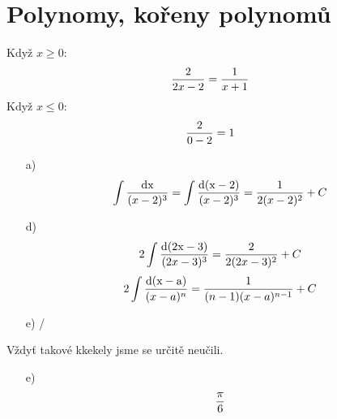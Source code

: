 
\BeginDoc{}
\section{Polynomy, kořeny polynomů}
\def\d{\rm d}
Když $x\ge 0$:
$$\frac{2}{2x-2} = \frac{1}{x+1}$$
Když $x\le 0$:
$$\frac{2}{0-2} = 1$$
\def\dec{\left| 
\begin{array}{ccc}}
\def\dee{\end{array}
\right|}
\begin{enumerate}
	\item[a)]
		$$\int \f{\d x}{(x-2)^3} =  \int \f{\d(x-2)}{(x-2)^3} = \f 1{2(x-2)^2} +C$$
	\item[d)]
		$$2  \int\f{\d(2x-3)}{(2x-3)^3} = \f 2 {2 (2x-3)^2} + C$$
		$$2  \int\f{\d(x-a)}{(x-a)^n} = \f 1 {(n-1) (x-a)^{n-1}} + C$$
	\item[e)]/
\end{enumerate}

Vždyť takové kkekely jsme se určitě neučili.
\begin{enumerate}
	\item [e)]
		$$\frac \pi 6$$
\end{enumerate}


